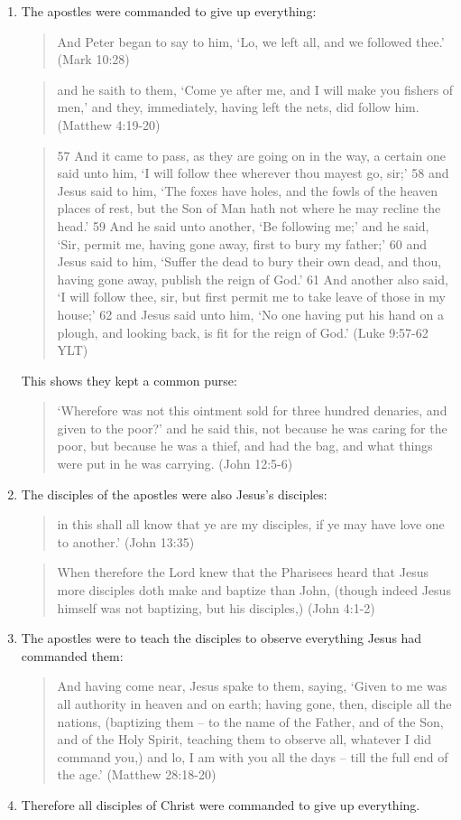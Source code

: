 \documentclass[11pt]{article}
\begin{document}
\begin{enumerate}
\item The apostles were commanded to give up everything:
\begin{quote}
And Peter began to say to him, `Lo, we left all, and we followed thee.' 
(Mark 10:28)
\end{quote}
\begin{quote}
and he saith to them, `Come ye after me, and I will make you fishers of men,' and they, immediately, having left the nets, did follow him.
(Matthew 4:19-20)
\end{quote}
\begin{quote}
57 And it came to pass, as they are going on in the way, a certain one
said unto him, ‘I will follow thee wherever thou mayest go, sir;’ 58 and Jesus said to him, ‘The foxes have holes, and the fowls of the heaven places of rest, but the Son of Man hath not where he may recline the head.’ 59 And he said unto another, ‘Be following me;’ and he said, ‘Sir, permit me, having gone away, first to bury my father;’ 60 and Jesus said to him, ‘Suffer the dead to bury their own dead, and thou, having gone away, publish the reign of God.’ 61 And another also said, ‘I will follow thee, sir, but first permit me to take leave of those in my house;’ 62 and Jesus said unto him, ‘No one having put his hand on a plough, and looking back, is fit for the reign of God.’ (Luke 9:57-62 YLT)
\end{quote}
\noindent This shows they kept a common purse:
\begin{quote}
`Wherefore was not this ointment sold for three hundred denaries, and given to the poor?' and he said this, not because he was caring for the poor, but because he was a thief, and had the bag, and what things were put in he was carrying. (John 12:5-6) 
\end{quote}
\item The disciples of the apostles were also Jesus's disciples:
\begin{quote}
in this shall all know that ye are my disciples, if ye may have love one to another.' (John 13:35) 
\end{quote}
\begin{quote}
When therefore the Lord knew that the Pharisees heard that Jesus more disciples doth make and baptize than John, (though indeed Jesus himself was not baptizing, but his disciples,) (John 4:1-2) 
\end{quote}
\item The apostles were to teach the disciples to observe everything Jesus had commanded them: 
\begin{quote}
And having come near, Jesus spake to them, saying, `Given to me was all authority in heaven and on earth;
having gone, then, disciple all the nations, (baptizing them -- to the name of the Father, and of the Son, and of the Holy Spirit,
teaching them to observe all, whatever I did command you,) and lo, I am with you all the days -- till the full end of the age.' (Matthew 28:18-20)
\end{quote}
\item Therefore all disciples of Christ were commanded to give up everything.\newline 
\end{enumerate}
\end{document}
